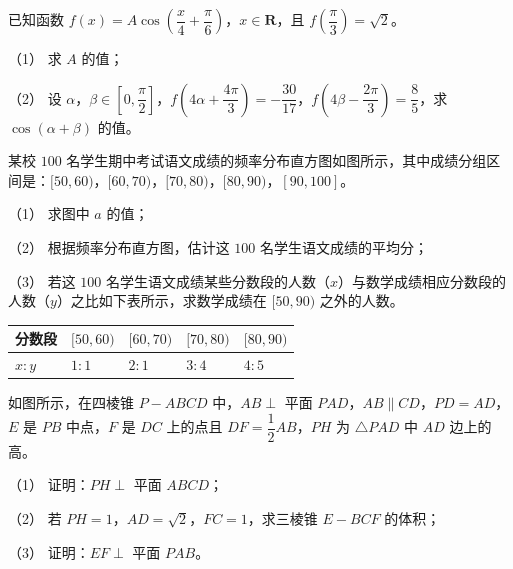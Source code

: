 \begin{question}
已知函数 $f(x)=A\cos\left(\dfrac x4+\dfrac\pi6\right)$，$x\in\mathbf R$，且 $f\left(\dfrac\pi3\right)=\sqrt2$。

（1） 求 $A$ 的值；

（2） 设 $\alpha$，$\beta\in\left[0,\dfrac\pi2\right]$，$f\left(4\alpha+\dfrac{4\pi}{3}\right)=-\dfrac{30}{17}$，$f\left(4\beta-\dfrac{2\pi}{3}\right)=\dfrac85$，求 $\cos(\alpha+\beta)$ 的值。

\Needspace{0.4\textheight}
\end{question}
\begin{question}
某校 $100$ 名学生期中考试语文成绩的频率分布直方图如图所示，其中成绩分组区间是：$[50,60)$，$[60,70)$，$[70,80)$，$[80,90)$，$[90,100]$。
\nopagebreak[4]
\begin{center}\end{center}
\nopagebreak[4]
（1） 求图中 $a$ 的值；

（2） 根据频率分布直方图，估计这 $100$ 名学生语文成绩的平均分；

（3） 若这 $100$ 名学生语文成绩某些分数段的人数（$x$）与数学成绩相应分数段的人数（$y$）之比如下表所示，求数学成绩在 $[50,90)$ 之外的人数。

\begin{center}
\begin{tabular}{lllll}
\toprule
分数段 & $[50,60)$ & $[60,70)$ & $[70,80)$ & $[80,90)$ \\
\midrule
$x:y$ & $1:1$ & $2:1$ & $3:4$ & $4:5$ \\
\bottomrule
\end{tabular}
\end{center}

\Needspace{0.4\textheight}
\end{question}
\begin{question}
如图所示，在四棱锥 $P-ABCD$ 中，$AB\perp$ 平面 $PAD$，$AB\parallel CD$，$PD=AD$，$E$ 是 $PB$ 中点，$F$ 是 $DC$ 上的点且 $DF=\dfrac12AB$，$PH$ 为 $\triangle PAD$ 中 $AD$ 边上的高。

（1） 证明：$PH\perp$ 平面 $ABCD$；

（2） 若 $PH=1$，$AD=\sqrt2$，$FC=1$，求三棱锥 $E-BCF$ 的体积；

（3） 证明：$EF\perp$ 平面 $PAB$。
\nopagebreak[4]
\begin{center}\end{center}
\nopagebreak[4]
\end{question}
